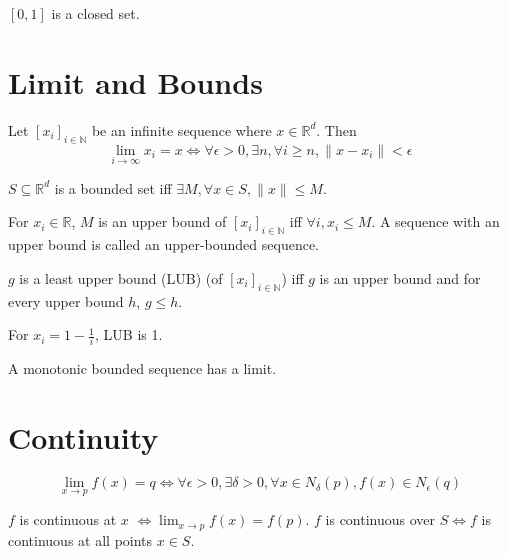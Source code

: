 \begin{example} $[0, 1]$ is a closed set. \end{example}

\section{Limit and Bounds}

\begin{definition} Let $[x_i]_{i \in \mathbb{N}}$ be an infinite sequence
where $x \in \mathbb{R}^d$. Then
\[ \lim_{i \rightarrow \infty} x_i = x
\iff \forall \epsilon > 0, \exists n, \forall i \ge n, \|x - x_i\| < \epsilon \]
\end{definition}

\begin{definition} $S \subseteq \mathbb{R}^d$ is a bounded set
iff $\exists M, \forall x \in S, \|x\| \le M$. \end{definition}

\begin{definition} For $x_i \in \mathbb{R}$, $M$ is an upper bound of $[x_i]_{i \in \mathbb{N}}$
iff $\forall i, x_i \le M$. A sequence with an upper bound is called an upper-bounded sequence.
\end{definition}

\begin{definition} $g$ is a least upper bound (LUB) (of $[x_i]_{i \in \mathbb{N}}$) iff
$g$ is an upper bound and for every upper bound $h$, $g \le h$. \end{definition}

\begin{example} For $x_i = 1-\frac{1}{i}$, LUB is 1. \end{example}

\begin{theorem} A monotonic bounded sequence has a limit. \end{theorem}

\section{Continuity}

\begin{definition}
\[ \lim_{x\rightarrow p} f(x) = q \iff \forall \epsilon > 0, \exists \delta > 0,
\forall x \in N_{\delta}(p), f(x) \in N_{\epsilon}(q) \]
\end{definition}

\begin{definition}
$f$ is continuous at $x$ $\iff \lim_{x\rightarrow p} f(x) = f(p)$.
$f$ is continuous over $S \iff f$ is continuous at all points $x \in S$.
\end{definition}

